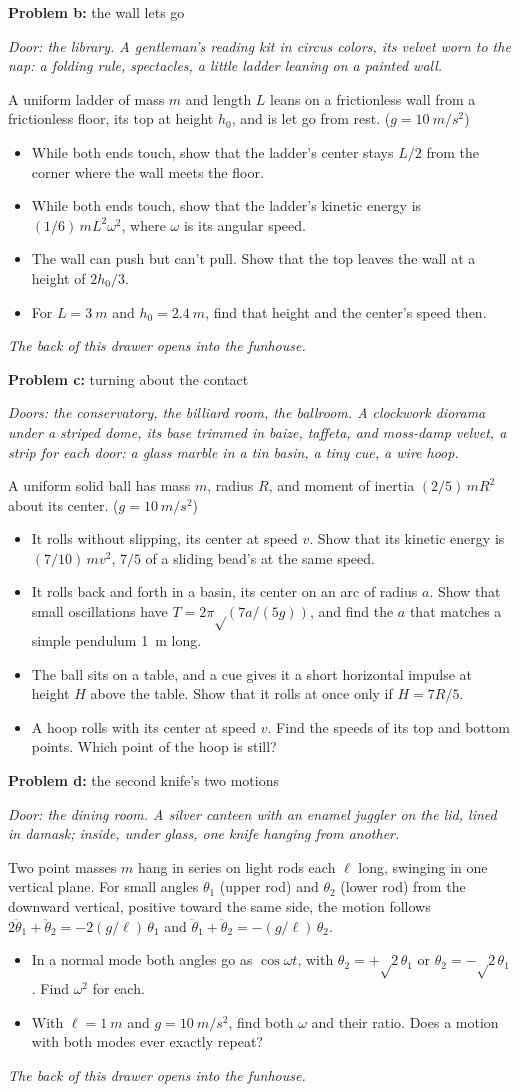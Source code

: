 \documentclass[11pt]{article}
\newcommand{\scene}[1]{\par{\itshape #1}\par}
\newcommand{\problem}[2]{\par\medskip\textbf{Problem #1:} #2\par\nopagebreak}
\newenvironment{parts}{\begin{itemize}[leftmargin=3.4em,labelwidth=2.8em,labelsep=0.6em,align=left,itemsep=2pt,topsep=3pt]}{\end{itemize}}
\newcommand{\pt}[1]{\item[\textbf{#1}]}
\newcommand{\rt}{\text{√}}  %
\begin{document}
\problem{b}{the wall lets go}
\scene{Door: the library. A gentleman's reading kit in circus colors, its velvet worn to the nap: a folding rule, spectacles, a little ladder leaning on a painted wall.}
A uniform ladder of mass $m$ and length $L$ leans on a frictionless wall from a frictionless floor, its top at height $h_0$, and is let go from rest. ($g = \SI{10}{m/s^2}$)
\begin{parts}
\pt{b-1} While both ends touch, show that the ladder's center stays $L/2$ from the corner where the wall meets the floor.
\pt{b-2} While both ends touch, show that the ladder's kinetic energy is $(1/6)\,mL^2\omega^2$, where $\omega$ is its angular speed.
\pt{b-3} The wall can push but can't pull. Show that the top leaves the wall at a height of $2h_0/3$.
\pt{b-4} For $L = \SI{3}{m}$ and $h_0 = \SI{2.4}{m}$, find that height and the center's speed then.
\end{parts}
\scene{The back of this drawer opens into the funhouse.}

\problem{c}{turning about the contact}
\scene{Doors: the conservatory, the billiard room, the ballroom. A clockwork diorama under a striped dome, its base trimmed in baize, taffeta, and moss-damp velvet, a strip for each door: a glass marble in a tin basin, a tiny cue, a wire hoop.}
A uniform solid ball has mass $m$, radius $R$, and moment of inertia $(2/5)\,mR^2$ about its center. ($g = \SI{10}{m/s^2}$)
\begin{parts}
\pt{c-1} It rolls without slipping, its center at speed $v$. Show that its kinetic energy is $(7/10)\,mv^2$, $7/5$ of a sliding bead's at the same speed.
\pt{c-2} It rolls back and forth in a basin, its center on an arc of radius $a$. Show that small oscillations have $T = 2\pi\rt(7a/(5g))$, and find the $a$ that matches a simple pendulum \SI{1}{m} long.
\pt{c-3} The ball sits on a table, and a cue gives it a short horizontal impulse at height $H$ above the table. Show that it rolls at once only if $H = 7R/5$.
\pt{c-4} A hoop rolls with its center at speed $v$. Find the speeds of its top and bottom points. Which point of the hoop is still?
\end{parts}

\problem{d}{the second knife's two motions}
\scene{Door: the dining room. A silver canteen with an enamel juggler on the lid, lined in damask; inside, under glass, one knife hanging from another.}
Two point masses $m$ hang in series on light rods each $\ell$ long, swinging in one vertical plane. For small angles $\theta_1$ (upper rod) and $\theta_2$ (lower rod) from the downward vertical, positive toward the same side, the motion follows $2\ddot\theta_1 + \ddot\theta_2 = -2(g/\ell)\,\theta_1$ and $\ddot\theta_1 + \ddot\theta_2 = -(g/\ell)\,\theta_2$.
\begin{parts}
\pt{d-1} In a normal mode both angles go as $\cos\omega t$, with $\theta_2 = +\rt2\,\theta_1$ or $\theta_2 = -\rt2\,\theta_1$. Find $\omega^2$ for each.
\pt{d-2} With $\ell = \SI{1}{m}$ and $g = \SI{10}{m/s^2}$, find both $\omega$ and their ratio. Does a motion with both modes ever exactly repeat?
\end{parts}
\scene{The back of this drawer opens into the funhouse.}
\end{document}
